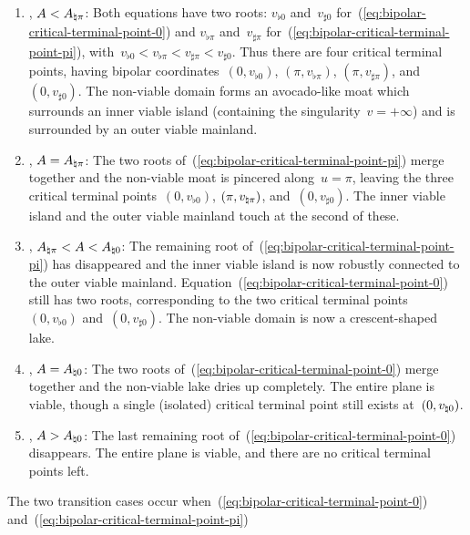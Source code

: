 \begin{enumerate}
  \item
    , $A < A_{\natural \pi}$:
    Both equations have two roots:
    $v_{\flat 0}$ and~$v_{\sharp 0}$
    for~(\ref{eq:bipolar-critical-terminal-point-0})
    and
    $v_{\flat \pi}$ and~$v_{\sharp \pi}$
    for~(\ref{eq:bipolar-critical-terminal-point-pi}),
    with~$v_{\flat 0} < v_{\flat \pi} < v_{\sharp \pi} < v_{\sharp 0}$.
    Thus there are four critical terminal points,
    having bipolar coordinates~$(0, v_{\flat 0})$, $(\pi, v_{\flat \pi})$,
    $(\pi, v_{\sharp \pi})$, and~$(0, v_{\sharp 0})$.
    The non-viable domain forms an avocado-like moat
    which surrounds an inner viable island
    (containing the singularity~$v = +\infty$)
    and is surrounded by an outer viable mainland.
  \item
    , $A = A_{\natural \pi}$:
    The two roots of~(\ref{eq:bipolar-critical-terminal-point-pi})
    merge together
    and the non-viable moat is pincered along~$u = \pi$,
    leaving the three critical terminal points~$(0, v_{\flat 0})$,
    $(\pi, v_{\natural \pi})$, and~$(0, v_{\sharp 0})$.
    The inner viable island and the outer viable mainland
    touch at the second of these.
  \item
    , $A_{\natural \pi} < A < A_{\natural 0}$:
    The remaining root of~(\ref{eq:bipolar-critical-terminal-point-pi})
    has disappeared
    and the inner viable island is now robustly connected
    to the outer viable mainland.
    Equation~(\ref{eq:bipolar-critical-terminal-point-0}) still has two roots,
    corresponding to the two critical terminal points~%
      $(0, v_{\flat 0})$ and~$(0, v_{\sharp 0})$.
    The non-viable domain is now a crescent-shaped lake.
  \item
    , $A = A_{\natural 0}$:
    The two roots of~(\ref{eq:bipolar-critical-terminal-point-0})
    merge together
    and the non-viable lake dries up completely.
    The entire plane is viable,
    though a single (isolated) critical terminal point still exists
    at~$(0, v_{\natural 0})$.
  \item
    , $A > A_{\natural 0}$:
    The last remaining root of~(\ref{eq:bipolar-critical-terminal-point-0})
    disappears.
    The entire plane is viable,
    and there are no critical terminal points left.
\end{enumerate}
The two transition cases occur
when~(\ref{eq:bipolar-critical-terminal-point-0})
and~(\ref{eq:bipolar-critical-terminal-point-pi})
